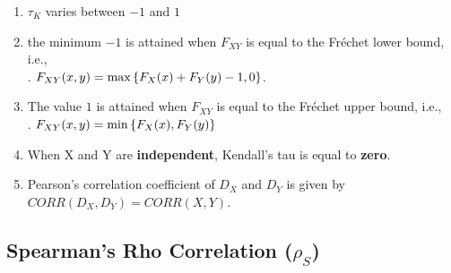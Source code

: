 \begin{enumerate}
    \item $\tau_K$ varies between $-1$ and $1$
    \hfill \cite{statistics/book/Statistics-for-Data-Scientists/Maurits-Kaptein}

    \item the minimum $-1$ is attained when $F_{X Y}$ is equal to the Fréchet lower bound, i.e.,
    \hfill \cite{statistics/book/Statistics-for-Data-Scientists/Maurits-Kaptein}
    \\
    .\hfill
    $F _{X Y} (x, y) = \max\left\{F_X (x) + F_Y (y) - 1, 0\right\}$.
    \hfill \cite{statistics/book/Statistics-for-Data-Scientists/Maurits-Kaptein}

    \item The value $1$ is attained when $F_{X Y}$ is equal to the Fréchet upper bound, i.e., 
    \hfill \cite{statistics/book/Statistics-for-Data-Scientists/Maurits-Kaptein}
    \\
    .\hfill
    $F_{X Y} (x, y) = \min\left\{F_X (x), F_Y (y)\right\}$
    \hfill \cite{statistics/book/Statistics-for-Data-Scientists/Maurits-Kaptein}

    \item When X and Y are \textbf{independent}, Kendall’s tau is equal to \textbf{zero}.
    \hfill \cite{statistics/book/Statistics-for-Data-Scientists/Maurits-Kaptein}

    \item Pearson’s correlation coefficient of $D_X$ and $D_Y$ is given by $CORR(D_X , D_Y ) = CORR(X, Y )$.
    \hfill \cite{statistics/book/Statistics-for-Data-Scientists/Maurits-Kaptein}

\end{enumerate}



\subsection{Spearman’s Rho Correlation ($\rho_S$)}

